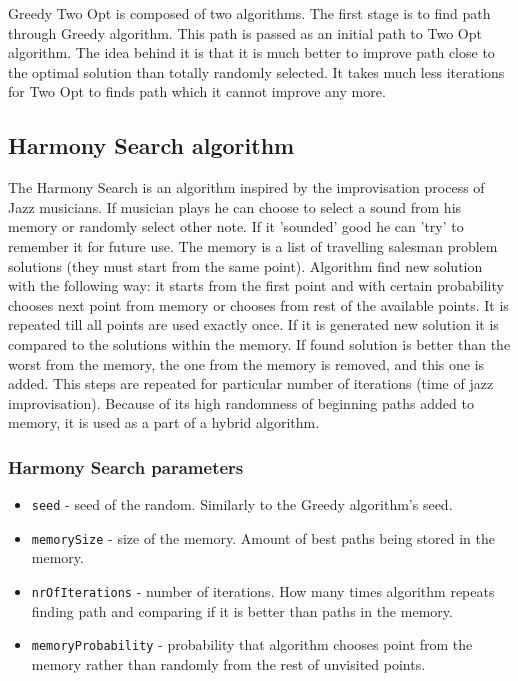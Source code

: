 \documentclass[titlepage]{article}
\begin{document}
Greedy Two Opt is composed of two algorithms. The first stage is to find path through Greedy algorithm. This path is passed as an initial path to Two Opt algorithm. The idea behind it is that it is much better to improve path close to the optimal solution than totally randomly selected. It takes much less iterations for Two Opt to finds path which it cannot improve any more. 

\subsection{Harmony Search algorithm}

The Harmony Search is an algorithm inspired by the improvisation process of Jazz musicians. If musician plays he can choose to select a sound from his memory or randomly select other note. If it 'sounded' good he can 'try' to remember it for future use. The memory is a list of travelling salesman problem solutions (they must start from the same point). Algorithm find new solution with the following way: it starts from the first point and with certain probability chooses next point from memory or chooses from rest of the available points. It is repeated till all points are used exactly once. If it is generated new solution it is compared to the solutions within the memory. If found solution is better than the worst from the memory, the one from the memory is removed, and this one is added. This steps are repeated for particular number of iterations (time of jazz improvisation). Because of its high randomness of beginning paths added to memory, it is used as a part of a hybrid algorithm.

\subsubsection{Harmony Search parameters}

\begin{itemize}
	\item \texttt{seed} - seed of the random. Similarly to the Greedy algorithm's seed.
	
	\item \texttt{memorySize} - size of the memory. Amount of best paths being stored in the memory.
	
	\item \texttt{nrOfIterations} - number of iterations. How many times algorithm repeats finding path and comparing if it is better than paths in the memory.
	
	\item \texttt{memoryProbability} - probability that algorithm chooses point from the memory rather than randomly from the rest of unvisited points.
\end{itemize}
\end{document}

